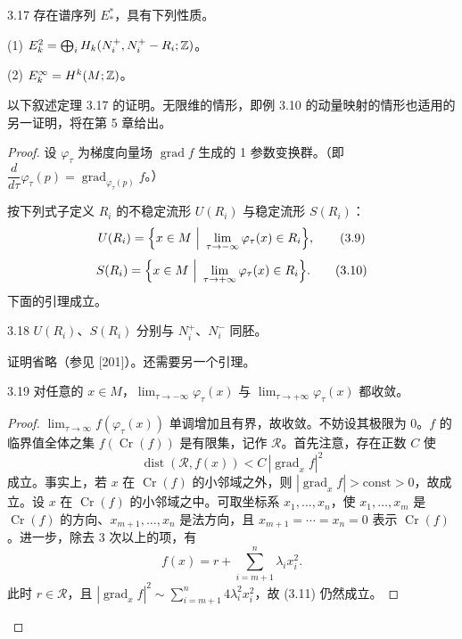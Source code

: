 \begin{theorem}{3.17}
  存在谱序列 $E^*_*$，具有下列性质。

  (1) $E^2_k=\bigoplus_iH_k(N_i^{+},N_i^{+}-R_i;\mathbb{Z})$。

  (2) $E^\infty_k=H^k(M;\mathbb{Z})$。
\end{theorem}


以下叙述定理 3.17 的证明。无限维的情形，即例 3.10 的动量映射的情形也适用的另一证明，将在第 5 章给出。

\begin{proof}
设 $\varphi_\tau$ 为梯度向量场 $\operatorname{grad}f$ 生成的 1 参数变换群。（即 $\dfrac{d}{d\tau}\varphi_\tau(p)=\operatorname{grad}_{\varphi_\tau(p)}f$。）

按下列式子定义 $R_i$ 的不稳定流形 $U(R_i)$ 与稳定流形 $S(R_i)$：
\begin{equation}
  U(R_i)=\Bigl\{x\in M\ \Big|\ \lim_{\tau\to-\infty}\varphi_\tau(x)\in R_i\Bigr\}, \tag{3.9}
\end{equation}
\begin{equation}
  S(R_i)=\Bigl\{x\in M\ \Big|\ \lim_{\tau\to+\infty}\varphi_\tau(x)\in R_i\Bigr\}. \tag{3.10}
\end{equation}
下面的引理成立。

\begin{lemma}{3.18}
  $U(R_i)$、$S(R_i)$ 分别与 $N_i^{+}$、$N_i^{-}$ 同胚。
\end{lemma}

证明省略（参见 [201]）。还需要另一个引理。

\begin{lemma*}{3.19}
  对任意的 $x\in M$，$\lim_{\tau\to-\infty}\varphi_\tau(x)$ 与 $\lim_{\tau\to+\infty}\varphi_\tau(x)$ 都收敛。
\end{lemma*}

\begin{proof}
  $\lim_{\tau\to\infty}f(\varphi_\tau(x))$ 单调增加且有界，故收敛。不妨设其极限为 0。$f$ 的临界值全体之集 $f(\operatorname{Cr}(f))$ 是有限集，记作 $\mathcal{R}$。首先注意，存在正数 $C$ 使
  \begin{equation}
    \operatorname{dist}(\mathcal{R},f(x))<C\,|\operatorname{grad}_xf|^2 \tag{3.11}
  \end{equation}
  成立。事实上，若 $x$ 在 $\operatorname{Cr}(f)$ 的小邻域之外，则 $|\operatorname{grad}_xf|>\mathrm{const}>0$，故成立。设 $x$ 在 $\operatorname{Cr}(f)$ 的小邻域之中。可取坐标系 $x_1,\dots,x_n$，使 $x_1,\dots,x_m$ 是 $\operatorname{Cr}(f)$ 的方向、$x_{m+1},\dots,x_n$ 是法方向，且 $x_{m+1}=\cdots=x_n=0$ 表示 $\operatorname{Cr}(f)$。进一步，除去 3 次以上的项，有
  \begin{equation}
    f(x)=r+\sum_{i=m+1}^{n}\lambda_ix_i^2. \tag{3.12}
  \end{equation}
  此时 $r\in\mathcal{R}$，且 $|\operatorname{grad}_xf|^2\sim\sum_{i=m+1}^{n}4\lambda_i^2x_i^2$，故 (3.11) 仍然成立。


\end{proof}
\end{proof}
